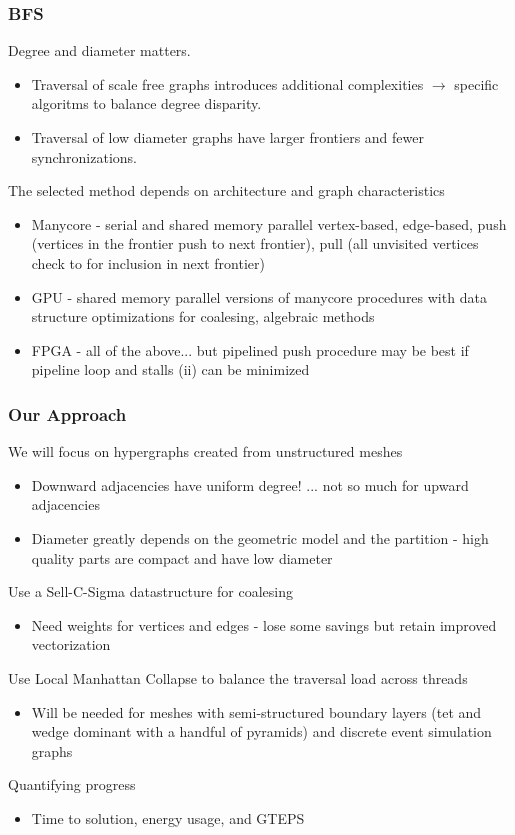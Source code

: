 \documentclass{beamer}
\begin{document}
\begin{frame}
  \frametitle{BFS}
  Degree and diameter matters.
  \begin{itemize}
    \item Traversal of scale free graphs introduces additional
      complexities $\rightarrow$ specific algoritms to balance degree disparity.
    \item Traversal of low diameter graphs have larger frontiers and fewer
      synchronizations.
  \end{itemize}
  The selected method depends on architecture and graph characteristics
  \begin{itemize}
    \item Manycore - serial and shared memory parallel vertex-based, edge-based, push (vertices
      in the frontier push to next frontier), pull (all unvisited vertices check
      to for inclusion in next frontier)
    \item GPU - shared memory parallel versions of manycore procedures with data structure
      optimizations for coalesing, algebraic methods
    \item FPGA - all of the above... but pipelined push procedure may be best if
      pipeline loop and stalls (ii) can be minimized
  \end{itemize}
\end{frame}

\begin{frame}
  \frametitle{Our Approach}
  We will focus on hypergraphs created from unstructured meshes
  \begin{itemize}
    \item Downward adjacencies have uniform degree! ... not so much for upward
      adjacencies
    \item Diameter greatly depends on the geometric model and the
      partition - high quality parts are compact and have low diameter
  \end{itemize}
  Use a Sell-C-Sigma datastructure for coalesing 
  \begin{itemize}
    \item Need weights for vertices and edges - lose some savings but retain
      improved vectorization
  \end{itemize}
  Use Local Manhattan Collapse to balance the traversal load across threads
  \begin{itemize}
    \item Will be needed for meshes with semi-structured boundary layers (tet
      and wedge dominant with a handful of pyramids) and discrete event
      simulation graphs
  \end{itemize}
  Quantifying progress
  \begin{itemize}
    \item Time to solution, energy usage, and GTEPS
  \end{itemize}
\end{frame}
\end{document}
